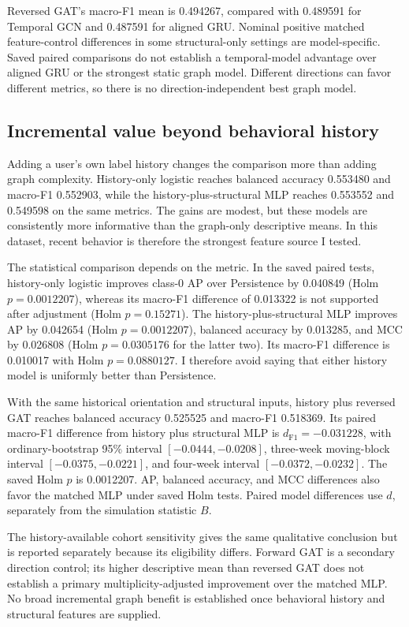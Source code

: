\documentclass[11pt,a4paper]{article}
\begin{document}
Reversed GAT's macro-F1 mean is 0.494267, compared with 0.489591 for Temporal GCN and 0.487591 for aligned GRU. Nominal positive matched feature-control differences in some structural-only settings are model-specific. Saved paired comparisons do not establish a temporal-model advantage over aligned GRU or the strongest static graph model. Different directions can favor different metrics, so there is no direction-independent best graph model.

\subsection{Incremental value beyond behavioral history}
Adding a user's own label history changes the comparison more than adding graph complexity. History-only logistic reaches balanced accuracy 0.553480 and macro-F1 0.552903, while the history-plus-structural MLP reaches 0.553552 and 0.549598 on the same metrics. The gains are modest, but these models are consistently more informative than the graph-only descriptive means. In this dataset, recent behavior is therefore the strongest feature source I tested.

The statistical comparison depends on the metric. In the saved paired tests, history-only logistic improves class-0 AP over Persistence by 0.040849 (Holm $p=0.0012207$), whereas its macro-F1 difference of 0.013322 is not supported after adjustment (Holm $p=0.15271$). The history-plus-structural MLP improves AP by 0.042654 (Holm $p=0.0012207$), balanced accuracy by 0.013285, and MCC by 0.026808 (Holm $p=0.0305176$ for the latter two). Its macro-F1 difference is 0.010017 with Holm $p=0.0880127$. I therefore avoid saying that either history model is uniformly better than Persistence.

With the same historical orientation and structural inputs, history plus reversed GAT reaches balanced accuracy 0.525525 and macro-F1 0.518369. Its paired macro-F1 difference from history plus structural MLP is $d_{\mathrm{F1}}=-0.031228$, with ordinary-bootstrap 95\% interval $[-0.0444,-0.0208]$, three-week moving-block interval $[-0.0375,-0.0221]$, and four-week interval $[-0.0372,-0.0232]$. The saved Holm $p$ is 0.0012207. AP, balanced accuracy, and MCC differences also favor the matched MLP under saved Holm tests. Paired model differences use $d$, separately from the simulation statistic $B$.

The history-available cohort sensitivity gives the same qualitative conclusion but is reported separately because its eligibility differs. Forward GAT is a secondary direction control; its higher descriptive mean than reversed GAT does not establish a primary multiplicity-adjusted improvement over the matched MLP. No broad incremental graph benefit is established once behavioral history and structural features are supplied.
\end{document}
